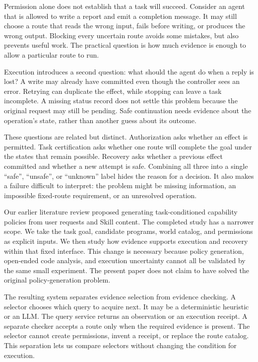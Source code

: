 \documentclass[conference]{IEEEtran}
\begin{document}
Permission alone does not establish that a task will succeed. Consider an agent that is allowed to write a report and emit a completion message. It may still choose a route that reads the wrong input, fails before writing, or produces the wrong output. Blocking every uncertain route avoids some mistakes, but also prevents useful work. The practical question is how much evidence is enough to allow a particular route to run.

Execution introduces a second question: what should the agent do when a reply is lost? A write may already have committed even though the controller sees an error. Retrying can duplicate the effect, while stopping can leave a task incomplete. A missing status record does not settle this problem because the original request may still be pending. Safe continuation needs evidence about the operation's state, rather than another guess about its outcome.

These questions are related but distinct. Authorization asks whether an effect is permitted. Task certification asks whether one route will complete the goal under the states that remain possible. Recovery asks whether a previous effect committed and whether a new attempt is safe. Combining all three into a single ``safe'', ``unsafe'', or ``unknown'' label hides the reason for a decision. It also makes a failure difficult to interpret: the problem might be missing information, an impossible fixed-route requirement, or an unresolved operation.

Our earlier literature review proposed generating task-conditioned capability policies from user requests and Skill content. The completed study has a narrower scope. We take the task goal, candidate programs, world catalog, and permissions as explicit inputs. We then study how evidence supports execution and recovery within that fixed interface. This change is necessary because policy generation, open-ended code analysis, and execution uncertainty cannot all be validated by the same small experiment. The present paper does not claim to have solved the original policy-generation problem.

The resulting system separates evidence selection from evidence checking. A selector chooses which query to acquire next. It may be a deterministic heuristic or an LLM. The query service returns an observation or an execution receipt. A separate checker accepts a route only when the required evidence is present. The selector cannot create permissions, invent a receipt, or replace the route catalog. This separation lets us compare selectors without changing the condition for execution.
\end{document}
